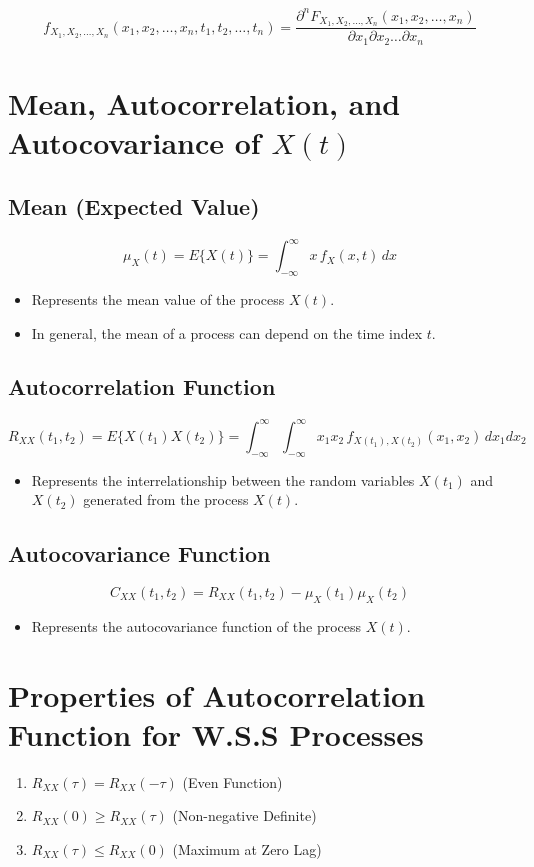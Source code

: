 \documentclass[12pt]{article}
\begin{document}
\[
f_{X_1, X_2, \ldots, X_n}(x_1, x_2, \ldots, x_n, t_1, t_2, \ldots, t_n) = \frac{\partial^n F_{X_1, X_2, \ldots, X_n}(x_1, x_2, \ldots, x_n)}{\partial x_1 \partial x_2 \ldots \partial x_n}
\]

\section{Mean, Autocorrelation, and Autocovariance of \( X(t) \)}
\subsection{Mean (Expected Value)}
\[
\mu_X(t) = E\{X(t)\} = \int_{-\infty}^{\infty} x \, f_X(x, t) \, dx
\]
\begin{itemize}
    \item Represents the mean value of the process \( X(t) \).
    \item In general, the mean of a process can depend on the time index \( t \).
\end{itemize}

\subsection{Autocorrelation Function}
\[
R_{XX}(t_1, t_2) = E\{X(t_1) X(t_2)\} = \int_{-\infty}^{\infty} \int_{-\infty}^{\infty} x_1 x_2 \, f_{X(t_1), X(t_2)}(x_1, x_2) \, dx_1 dx_2
\]
\begin{itemize}
    \item Represents the interrelationship between the random variables \( X(t_1) \) and \( X(t_2) \) generated from the process \( X(t) \).
\end{itemize}

\subsection{Autocovariance Function}
\[
C_{XX}(t_1, t_2) = R_{XX}(t_1, t_2) - \mu_X(t_1) \mu_X(t_2)
\]
\begin{itemize}
    \item Represents the autocovariance function of the process \( X(t) \).
\end{itemize}

\section{Properties of Autocorrelation Function for W.S.S Processes}
\begin{enumerate}[label=(\arabic*)]
    \item \( R_{XX}(\tau) = R_{XX}(-\tau) \) \hfill (Even Function)
    \item \( R_{XX}(0) \geq R_{XX}(\tau) \) \hfill (Non-negative Definite)
    \item \( R_{XX}(\tau) \leq R_{XX}(0) \) \hfill (Maximum at Zero Lag)
\end{enumerate}
\end{document}
